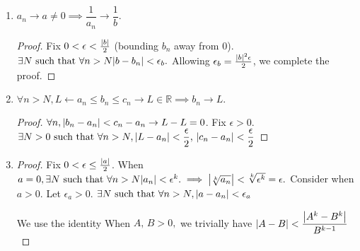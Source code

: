 \begin{enumerate}
    \item $a_n\rightarrow a\neq0\implies \dfrac{1}{a_n}\rightarrow\dfrac{1}{b}.$
    \begin{proof}
        Fix $0<\epsilon<\frac{\abs{b}}{2}$ (bounding $b_n$ away from $0$). $\exists N\text{ such that }\forall n>N \abs{b-b_n}<\epsilon_b.$
        Allowing $\epsilon_b=\frac{\abs{b}^2\epsilon}{2}$, we complete the proof.
    \end{proof}
    
    \item 
    \begin{theorem}
        $\forall n>N,L\leftarrow a_n \leq b_n \leq c_n\rightarrow L\in\mathbb{R}\implies b_n\rightarrow L.$
    \end{theorem}
    \begin{proof}
        $\forall n,\abs{b_n-a_n}<c_n-a_n\rightarrow L-L=0$. Fix $\epsilon>0$. $\exists N>0\text{ such that }\forall n>N,\abs{L-a_n}<\dfrac{\epsilon}{2},\,\abs{c_n-a_n}<\dfrac{\epsilon}{2}$
    \end{proof}
    
    \item
    \begin{proof}
        Fix $0<\epsilon\leq\frac{\abs{a}}{2}$. When $a=0,\exists N\text{ such that }\forall n>N \abs{a_n}<\epsilon^k.\implies \abs{\sqrt[k]{a_n}}<\sqrt[k]{\epsilon^k}=\epsilon.$ Consider when $a>0.$ Let $\epsilon_a>0.$ $\exists N\text{ such that }\forall n>N,\abs{a-a_n}<\epsilon_a$
        
        We use the identity
        When $A,\,B>0,$ we trivially have $\abs{A-B}<\dfrac{\abs{A^k-B^k}}{B^{k-1}}$
        

\end{proof}
\end{enumerate}
